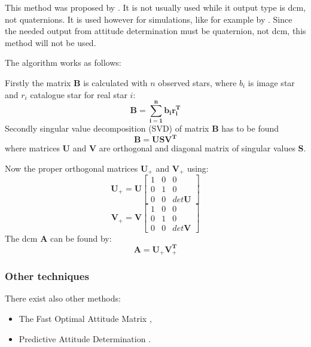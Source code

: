 \documentclass[12pt,a4paper,twoside]{article}
\begin{document}
This method was proposed by \citet{markley1988attitude}. It is not usually used while it output type is \gls{dcm}, not quaternions. It is used however for simulations, like for example by \citet{mcbryde2012star}.
Since the needed output from attitude determination must be quaternion, not \gls{dcm}, this method will not be used.
 
The algorithm works as follows:

Firstly the matrix $\bm{B}$ is calculated with $n$ observed stars, where $b_i$ is image star and $r_i$ catalogue star for real star $i$:
\begin{equation}
\bm{B = \sum_{i=1}^nb_ir_i^T}
\end{equation}
Secondly singular value decomposition (SVD) of matrix $\bm{B}$ has to be found
\begin{equation}
\bm{B = USV^T}
\end{equation}
where matrices $\bm{U}$ and $\bm{V}$ are orthogonal and diagonal matrix of singular values $\bm{S}$.

Now the proper orthogonal matrices $\bm{U}_+$ and $\bm{V}_+$ using:
\begin{equation}
\bm{U}_+ = \bm{U}\begin{bmatrix}
1 & 0 & 0 \\
0 & 1 & 0 \\
0 & 0 & det\bm{U}
\end{bmatrix}
\end{equation}
\begin{equation}
\bm{V}_+ = \bm{V}\begin{bmatrix}
1 & 0 & 0 \\
0 & 1 & 0 \\
0 & 0 & det\bm{V}
\end{bmatrix}
\end{equation}
The \gls{dcm} $\bm{A}$ can be found by:
\begin{equation}
\bm{A = U_+V_+^T}
\end{equation}

\subsubsection{Other techniques}
There exist also other methods:
\begin{itemize}
\item The Fast Optimal Attitude Matrix \cite{markley1993attitude},
\item Predictive Attitude Determination \cite{crassidis1997predictive}.
\end{itemize}
\end{document}
